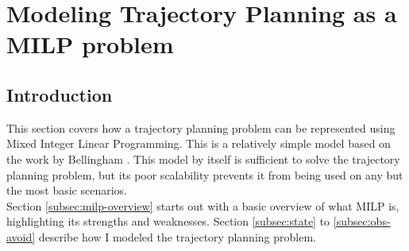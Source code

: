 \section{Modeling Trajectory Planning as a MILP problem}
\label{section:modelingbasic}
\subsection{Introduction}
This section covers how a trajectory planning problem can be represented using Mixed Integer Linear Programming. This is a relatively simple model based on the work by Bellingham \cite{Bellingham2002}. This model by itself is sufficient to solve the trajectory planning problem, but its poor scalability prevents it from being used on any but the most basic scenarios. \\

Section \ref{subsec:milp-overview} starts out with a basic overview of what MILP is, highlighting its strengths and weaknesses. Section \ref{subsec:state} to \ref{subsec:obs-avoid} describe how I modeled the trajectory planning problem. 







